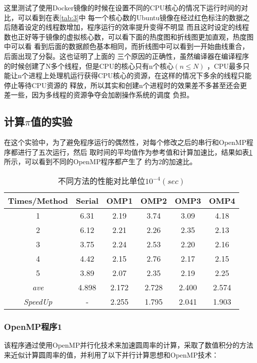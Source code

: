 \documentclass{article}
\begin{document}
这里测试了使用Docker镜像的时候在设置不同的CPU核心的情况下运行时间的对比，可以看到在表\ref{tab:3}中
每一个核心数的Ubuntu镜像在经过红色标注的数据之后随着设定的线程数增加，程序运行的效率提升变得不明显
而且这时设定的线程数也正好等于镜像的虚拟核心数，可以看下面的热度图和折线图更加直观，热度图中可以看
看到后面的数据颜色基本相同，而折线图中可以看到一开始曲线重合，后面出现了分裂。这也证明了上面的
三个原因的正确性，虽然编译器在编译程序的时候创建了N多个线程，但是CPU的核心只有n个核心$(n \leq N)$
，CPU最多只能让n个进程上处理机运行获得CPU核心的资源，在这样的情况下多余的线程只能停止等待CPU资源的
释放，所以其实和创建n个进程时的效果差不多甚至还会更差一些，因为多线程的资源争夺会加剧操作系统的调度
负担。
\subsection{计算$\pi$值的实验}
在这个实验中，为了避免程序运行的偶然性，对每个修改之后的串行和OpenMP程序都进行了五次运行，然后
取时间的平均值作为参考值和计算加速比，结果如表\ref{tab:4}所示，可以看到不同的OpenMP程序都产生了
约为2的加速比。
\begin{table}[h]
    \centering
    \caption{不同方法的性能对比单位$10^{-4}(sec)$}
    \label{tab:4}
    \begin{tabular}{@{}cccccc@{}}
    \toprule
    Times/Method & Serial & OMP1 & OMP2 & OMP3 & OMP4 \\ \midrule
    1            & 6.31   & 2.19  & 3.74  & 3.09  & 4.18  \\
    2            & 6.12   & 2.21  & 2.26  & 2.35  & 2.13  \\
    3            & 3.75   & 2.24  & 2.53  & 2.20  & 2.16  \\
    4            & 4.42   & 2.15  & 2.76  & 2.17  & 2.15  \\
    5            & 3.89   & 2.07  & 2.35  & 2.19  & 2.25  \\
    \textit{ave} & 4.898  & 2.172 & 2.728 & 2.400 & 2.574 \\
    \textit{SpeedUp} & -     & 2.255 & 1.795 & 2.041 & 1.903 \\ \bottomrule
    \end{tabular}
\end{table}
\subsubsection{OpenMP程序1}
该程序通过使用OpenMP并行化技术来加速圆周率的计算，采取了数值积分的方法来近似计算圆周率的值，并利用了以下并行计算思想和OpenMP技术：
\end{document}
